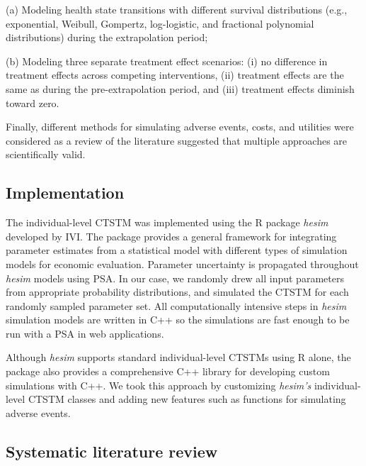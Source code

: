 \documentclass[11pt,final,fleqn]{article}\usepackage[]{graphicx}\usepackage[]{color}
\theoremstyle{plain}
\begin{document}
{(a) Modeling health state transitions with different survival distributions (e.g., exponential, Weibull, Gompertz, log-logistic, and fractional polynomial distributions) during the extrapolation period;

(b) Modeling three separate treatment effect scenarios: (i) no difference in treatment effects across competing interventions, (ii) treatment effects are the same as during the pre-extrapolation period, and (iii) treatment effects diminish toward zero. 

Finally, different methods for simulating adverse events, costs, and utilities were considered as a review of the literature suggested that multiple approaches are scientifically valid.

\subsection{Implementation} 

The individual-level CTSTM was implemented using the R package \textit{hesim} developed by IVI. The package provides a general framework for integrating parameter estimates from a statistical model with different types of simulation models for economic evaluation. Parameter uncertainty is propagated throughout \textit{hesim} models using PSA. In our case, we randomly drew all input parameters from appropriate probability distributions, and simulated the CTSTM for each randomly sampled parameter set. All computationally intensive steps in \textit{hesim} simulation models are written in C++ so the simulations are fast enough to be run with a PSA in web applications. 


Although \textit{hesim} supports standard individual-level CTSTMs using R alone, the package also provides a comprehensive C++ library for developing custom simulations with C++. We took this approach by customizing \textit{hesim's} individual-level CTSTM classes and adding new features such as functions for simulating adverse events. 


 
\citet{baio2015probabilistic}

\begin{appendices}
\setcounter{table}{0}
\renewcommand{\thetable}{A\arabic{table}}
\setcounter{figure}{0}
\renewcommand{\thefigure}{A\arabic{figure}}
\setcounter{equation}{0}
\renewcommand{\theequation}{A\arabic{equation}}

\section{Systematic literature review}\label{app:slr}


\end{appendices}}
\end{document}
